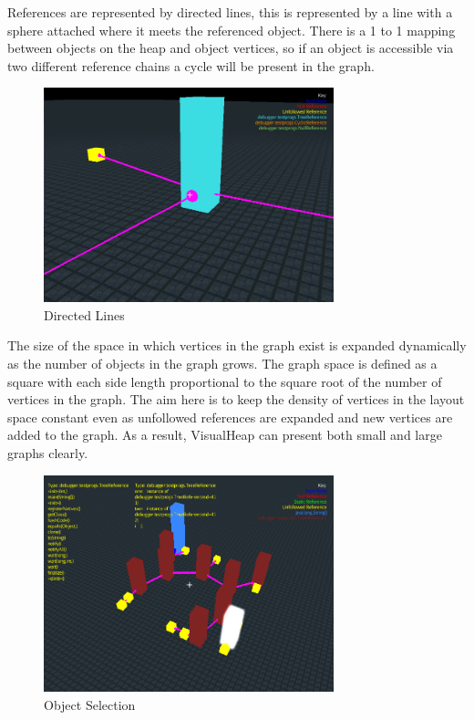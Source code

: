 \documentclass[11pt, a4paper]{report}
\begin{document}
References are represented by directed lines, this is represented by a line with a sphere attached where it meets the referenced object. There is a 1 to 1 mapping between objects on the heap and object vertices, so if an object is accessible via two different reference chains a cycle will be present in the graph.

\begin{figure}[h]
        \centering
        \includegraphics[width=0.75\textwidth]{images/final/directed_lines.png}
        \caption{Directed Lines}
\end{figure} 

The size of the space in which vertices in the graph exist is expanded dynamically as the number of objects in the graph grows.  The graph space is defined as a square with each side length proportional to the square root of the number of vertices in the graph. The aim here is to keep the density of vertices in the layout space constant even as unfollowed references are expanded and new vertices are added to the graph. As a result, VisualHeap can present both small and large graphs clearly.

\begin{figure}[h]
        \centering
        \includegraphics[width=0.75\textwidth]{images/final/dynamicoff.png}
        \caption{Object Selection}
\end{figure}
\end{document}
